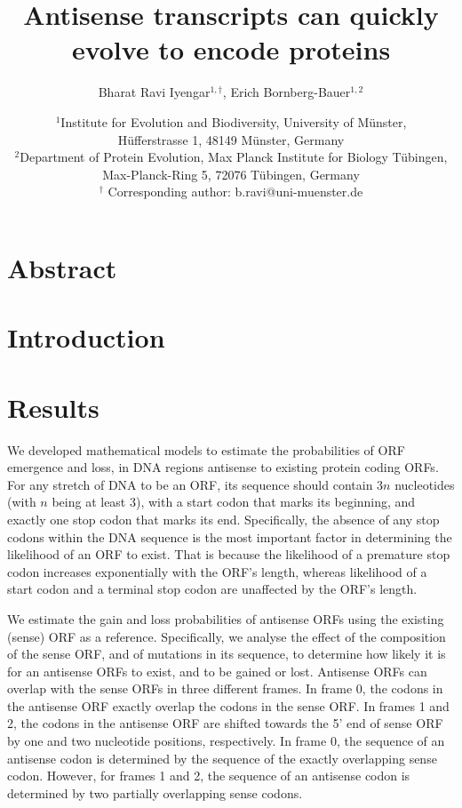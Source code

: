 \documentclass[12pt,a4paper]{article}
\title{Antisense transcripts can quickly evolve to encode proteins}
\author{Bharat Ravi Iyengar$^{1,\dagger}$, Erich Bornberg-Bauer$^{1,2}$}
\date{\small $^1$Institute for Evolution and Biodiversity, University of M\"{u}nster,\\ H\"{u}fferstrasse 1, 48149 M\"{u}nster, Germany\\[1ex] $^2$Department of Protein Evolution, Max Planck Institute for Biology T\"{u}bingen, Max-Planck-Ring 5, 72076 T\"{u}bingen, Germany \\[1ex] $^\dagger$ Corresponding author: b.ravi@uni-muenster.de}
\begin{document}
\onehalfspacing
\def\figdir{../Figures/M1_main}

\setlength{\abovedisplayskip}{0pt}
\setlength{\belowdisplayskip}{1em}

\maketitle


\linenumbers

\section*{Abstract}




\section*{Introduction}



\section*{Results}

We developed mathematical models to estimate the probabilities of ORF emergence and loss, in DNA regions antisense to existing protein coding ORFs. For any stretch of DNA to be an ORF, its sequence should contain 3$n$ nucleotides (with $n$ being at least 3), with a start codon that marks its beginning, and exactly one stop codon that marks its end. Specifically, the absence of any stop codons within the DNA sequence is the most important factor in determining the likelihood of an ORF to exist. That is because the likelihood of a premature stop codon increases exponentially with the ORF's length, whereas likelihood of a start codon and a terminal stop codon are unaffected by the ORF's length. 

We estimate the gain and loss probabilities of antisense ORFs using the existing (sense) ORF as a reference. Specifically, we analyse the effect of the composition of the sense ORF, and of mutations in its sequence, to determine how likely it is for an antisense ORFs to exist, and to be gained or lost. Antisense ORFs can overlap with the sense ORFs in three different frames. In frame 0, the codons in the antisense ORF exactly overlap the codons in the sense ORF. In frames 1 and 2, the codons in the antisense ORF are shifted towards the 5' end of sense ORF by one and two nucleotide positions, respectively. In frame 0, the sequence of an antisense codon is determined by the sequence of the exactly overlapping sense codon. However, for frames 1 and 2, the sequence of an antisense codon is determined by two partially overlapping sense codons.
\end{document}

